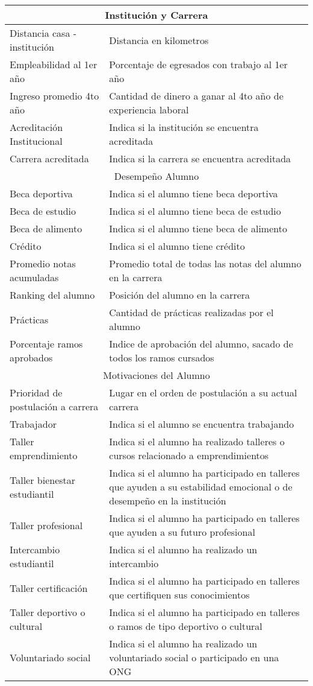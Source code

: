 \begin{longtable}{| p{4cm}| p{8cm} |}
	\multicolumn{2}{|c|}{Institución y Carrera} \\ \hline
	\hline
	Distancia casa - institución & Distancia en kilometros \\ \hline
	Empleabilidad al 1er año  & Porcentaje de egresados con trabajo al 1er año \\ \hline
	Ingreso promedio 4to año & Cantidad de dinero a ganar al 4to año de experiencia laboral  \\ \hline
	Acreditación Institucional & Indica si la institución se encuentra acreditada\\ \hline
    Carrera acreditada & Indica si la carrera se encuentra acreditada \\ \hline 
    \hline
    \multicolumn{2}{|c|}{Desempeño Alumno} \\ \hline
    \hline	
	Beca deportiva & Indica si el alumno tiene beca deportiva\\ \hline
    Beca de estudio  & Indica si el alumno tiene beca de estudio\\ \hline
    Beca de alimento & Indica si el alumno tiene beca de alimento\\ \hline
    Crédito  & Indica si el alumno tiene crédito\\ \hline
    Promedio notas acumuladas & Promedio total de todas las notas del alumno en la carrera\\ \hline    
    Ranking del alumno & Posición del alumno en la carrera\\ \hline
    Prácticas & Cantidad de prácticas realizadas por el alumno\\ \hline 
	Porcentaje ramos aprobados & Indice de aprobación del alumno, sacado de todos los ramos cursados\\ \hline
    \hline
	\multicolumn{2}{|c|}{Motivaciones del Alumno} \\ \hline
	\hline	   
	Prioridad de postulación a carrera  & Lugar en el orden de postulación a su actual carrera\\ \hline
	Trabajador &  Indica si el alumno se encuentra trabajando\\ \hline 
	Taller emprendimiento  & Indica si el alumno ha realizado talleres o cursos relacionado a emprendimientos\\ \hline
	Taller bienestar estudiantil & Indica si el alumno ha participado en talleres que ayuden a su estabilidad emocional o de desempeño en la institución\\ \hline		
	Taller profesional  & Indica si el alumno ha participado en talleres que ayuden a su futuro profesional\\ \hline
	Intercambio estudiantil & Indica si el alumno ha realizado un intercambio\\ \hline
	Taller certificación & Indica si el alumno ha participado en talleres que certifiquen sus conocimientos \\ \hline
	Taller deportivo o cultural &  Indica si el alumno ha participado en talleres o ramos de tipo deportivo o cultural\\ \hline
	Voluntariado social  & Indica si el alumno ha realizado un voluntariado social o participado en una ONG\\ \hline
	

\end{longtable}
